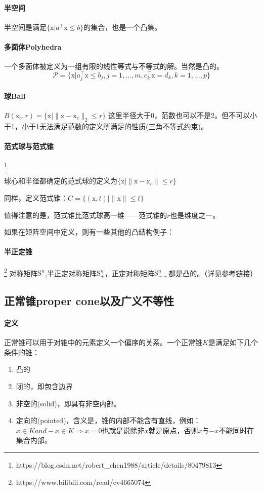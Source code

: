 \documentclass[a4paper]{D:/MyRepo/Script/latex/PaperReadingLog}
\begin{document}
\paragraph{半空间}半空间是满足$\{\mathrm{x}|a^\top \mathrm{x}\le b\}$的集合，也是一个凸集。
\paragraph{多面体Polyhedra}一个多面体被定义为一组有限的线性等式与不等式的解。当然是凸的。
$$
\mathcal{P}=\{\mathrm{x}|a_j^\top \mathrm{x}\le b_j,j=1,...,m,c_k^\top \mathrm{x}=d_k,k=1,...,p\}
$$

\paragraph{球Ball}$B(\mathrm{x}_c,r)=\{\mathrm{x}|\lVert \mathrm{x}-\mathrm{x}_c \lVert_2\le r\}$ 这里半径大于0，范数也可以不是2。但不可以小于1，小于1无法满足范数的定义所满足的性质(三角不等式约束)。

\paragraph{范式球与范式锥}\footnote{https://blog.csdn.net/robert\_chen1988/article/details/80479813}

球心和半径都确定的范式球的定义为$\{\mathrm{x}|\lVert \mathrm{x}-\mathrm{x}_c \lVert\le r\}$

同样，定义范式锥：$C=\{(\mathrm{x},t)|\lVert \mathrm{x} \lVert \le t\}$

值得注意的是，范式锥比范式球高一维——范式锥的$r$也是维度之一。

如果在矩阵空间中定义，则有一些其他的凸结构例子：
\paragraph{半正定锥} \footnote{https://www.bilibili.com/read/cv4665074}
对称矩阵$\mathrm{S}^n$,半正定对称矩阵$\mathrm{S}_+^n$，正定对称矩阵$\mathrm{S}_{++}^n$都是凸的。（详见参考链接）

\subsection{正常锥proper cone以及广义不等性}
\paragraph{定义} 正常锥可以用于对锥中的元素定义一个偏序的关系。一个正常锥$K$是满足如下几个条件的锥：
\begin{enumerate}
    \item 凸的
    \item 闭的，即包含边界
    \item 非空的(solid)，即具有非空内部。
    \item 定向的(pointed)，含义是，锥的内部不能含有直线，例如：$x\in K and -x\in K\Rightarrow x=0$也就是说除非$x$就是原点，否则$x$与$-x$不能同时在集合内部。
\end{enumerate}
\end{document}
